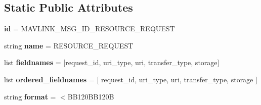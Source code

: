 \subsection*{Static Public Attributes}
\begin{DoxyCompactItemize}
\item 
\mbox{\label{classpymavlink_1_1dialects_1_1v10_1_1MAVLink__resource__request__message_a798dae3d38776c824108a1752500db29}} 
{\bfseries id} = M\+A\+V\+L\+I\+N\+K\+\_\+\+M\+S\+G\+\_\+\+I\+D\+\_\+\+R\+E\+S\+O\+U\+R\+C\+E\+\_\+\+R\+E\+Q\+U\+E\+ST
\item 
\mbox{\label{classpymavlink_1_1dialects_1_1v10_1_1MAVLink__resource__request__message_a3fc3f5c1ef57c5bbd8ca0e2c4c72684d}} 
string {\bfseries name} = \textquotesingle{}R\+E\+S\+O\+U\+R\+C\+E\+\_\+\+R\+E\+Q\+U\+E\+ST\textquotesingle{}
\item 
\mbox{\label{classpymavlink_1_1dialects_1_1v10_1_1MAVLink__resource__request__message_a751b9dc39adf043faed76a49351e7e3d}} 
list {\bfseries fieldnames} = \mbox{[}\textquotesingle{}request\+\_\+id\textquotesingle{}, \textquotesingle{}uri\+\_\+type\textquotesingle{}, \textquotesingle{}uri\textquotesingle{}, \textquotesingle{}transfer\+\_\+type\textquotesingle{}, \textquotesingle{}storage\textquotesingle{}\mbox{]}
\item 
\mbox{\label{classpymavlink_1_1dialects_1_1v10_1_1MAVLink__resource__request__message_a5c56d0291cad69edf51b9d37436f48c9}} 
list {\bfseries ordered\+\_\+fieldnames} = \mbox{[} \textquotesingle{}request\+\_\+id\textquotesingle{}, \textquotesingle{}uri\+\_\+type\textquotesingle{}, \textquotesingle{}uri\textquotesingle{}, \textquotesingle{}transfer\+\_\+type\textquotesingle{}, \textquotesingle{}storage\textquotesingle{} \mbox{]}
\item 
\mbox{\label{classpymavlink_1_1dialects_1_1v10_1_1MAVLink__resource__request__message_aa2a4c06078582e7db0c4e9cea68e0828}} 
string {\bfseries format} = \textquotesingle{}$<$B\+B120\+B\+B120B\textquotesingle{}

\end{DoxyCompactItemize}
